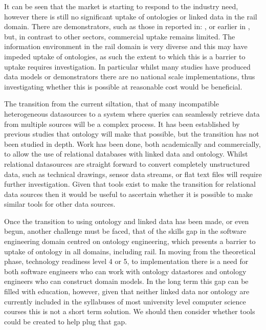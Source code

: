 It can be seen that the market is starting to respond to the industry need, however there is still no significant uptake of ontologies or linked data in the rail domain. There are demonstrators, such as those in reported in: \citep{Bhatti2016}, \citep{Tutcher2013} or earlier in \citep{Kopf2010}, but, in contrast to other sectors, commercial uptake remains limited. The information environment in the rail domain is very diverse and this may have impeded uptake of ontologies, as such the extent to which this is a barrier to uptake requires investigation.
In particular whilst many studies have produced data models or demonstrators there are no national scale implementations, thus investigating whether this is possible at reasonable cost would be beneficial. 

The transition from the current siltation, that of many incompatible heterogeneous datasources to a system where queries can seamlessly retrieve data from multiple sources will be a complex process. It has been established by previous studies that ontology will make that possible, but the transition has not been studied in depth. Work has been done, both academically and commercially, to allow the use of relational databases with linked data and ontology. Whilst relational datasources are straight forward to convert completely unstructured data, such as technical drawings, sensor data streams, or flat text files will require further investigation. Given that tools exist to make the transition for relational data sources then it would be useful to ascertain whether it is possible to make similar tools for other data sources.

Once the transition to using ontology and linked data has been made, or even begun, another challenge must be faced, that of the skills gap in the software engineering domain centred on ontology engineering, which presents a barrier to uptake of ontology in all domains, including rail. In moving from the theoretical phase, technology readiness level 4 or 5, to implementation there is a need for both software engineers who can work with ontology datastores and ontology engineers who can construct domain models. In the long term this gap can be filled with education, however, given that neither linked data nor ontology are currently included in the syllabuses of most university level computer science courses this is not a short term solution. We should then consider whether tools could be created to help plug that gap.

